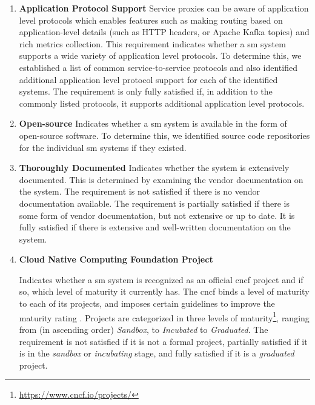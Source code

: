 \begin{enumerate}[label=\textbf{NFR\arabic*}, leftmargin=3\parindent]
    \item \textbf{Application Protocol Support}
    \label{nfr-1}
    Service proxies can be aware of application level protocols which enables features such as making routing based on application-level details (such as HTTP headers, or Apache Kafka topics) and rich metrics collection. This requirement indicates whether a \gls{sm} system supports a wide variety of application level protocols. To determine this, we established a list of common service-to-service protocols and also identified additional application level protocol support for each of the identified systems. The requirement is only fully satisfied if, in addition to the commonly listed protocols, it supports additional application level protocols.

    \item \textbf{Open-source}
    \label{nfr-2}
    Indicates whether a \gls{sm} system is available in the form of open-source software. To determine this, we identified source code repositories for the individual \gls{sm} systems if they existed.
    
    \item \textbf{Thoroughly Documented}
    \label{nfr-3}
    Indicates whether the system is extensively documented. This is determined by examining the vendor documentation on the system. The requirement is not satisfied if there is no vendor documentation available. The requirement is partially satisfied if there is some form of vendor documentation, but not extensive or up to date. It is fully satisfied if there is extensive and well-written documentation on the system.
    
    \item \textbf{Cloud Native Computing Foundation Project}
    \label{nfr-4}
    
    Indicates whether a \gls{sm} system is recognized as an official \gls{cncf} project and if so, which level of maturity it currently has. The \gls{cncf} binds a level of maturity to each of its projects,  and imposes certain guidelines to improve the maturity rating  \cite{cncf-project-graduation-criteria}. Projects are categorized in three levels of maturity\footnote{\url{https://www.cncf.io/projects/}}, ranging from (in ascending order) \textit{Sandbox}, to \textit{Incubated} to \textit{Graduated}. The requirement is not satisfied if it is not a formal project, partially satisfied if it is in the \textit{sandbox} or \textit{incubating} stage, and fully satisfied if it is a \textit{graduated} project.



\end{enumerate}
